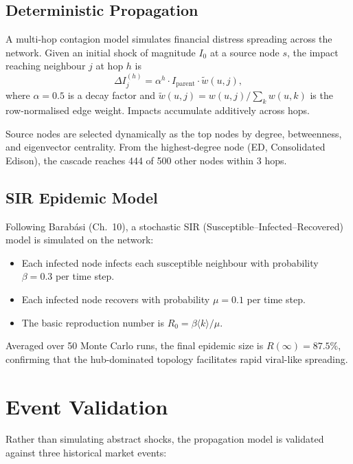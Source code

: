 \documentclass[11pt, a4paper]{article}
\begin{document}
\subsection{Deterministic Propagation}
A multi-hop contagion model simulates financial distress spreading across the network. Given an initial shock of magnitude $I_0$ at a source node $s$, the impact reaching neighbour $j$ at hop $h$ is
\begin{equation}
    \Delta I_j^{(h)} = \alpha^{h} \cdot I_{\text{parent}} \cdot \tilde{w}(u,j),
\end{equation}
where $\alpha = 0.5$ is a decay factor and $\tilde{w}(u,j) = w(u,j) / \sum_k w(u,k)$ is the row-normalised edge weight. Impacts accumulate additively across hops.

Source nodes are selected dynamically as the top nodes by degree, betweenness, and eigenvector centrality. From the highest-degree node (ED, Consolidated Edison), the cascade reaches 444 of 500 other nodes within 3 hops.

\subsection{SIR Epidemic Model}
Following Barab\'asi (Ch.~10), a stochastic SIR (Susceptible--Infected--Recovered) model is simulated on the network:
\begin{itemize}
    \item Each infected node infects each susceptible neighbour with probability $\beta = 0.3$ per time step.
    \item Each infected node recovers with probability $\mu = 0.1$ per time step.
    \item The basic reproduction number is $R_0 = \beta \langle k \rangle / \mu$.
\end{itemize}
Averaged over 50 Monte Carlo runs, the final epidemic size is $R(\infty) = 87.5\%$, confirming that the hub-dominated topology facilitates rapid viral-like spreading.

\section{Event Validation}

Rather than simulating abstract shocks, the propagation model is validated against three historical market events:
\end{document}
